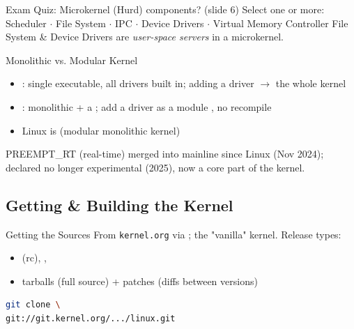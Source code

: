 \multend

\begin{example2}{Exam Quiz: Microkernel (Hurd) components? (slide 6)}
    Select one or more: Scheduler $\cdot$ File System $\cdot$ IPC $\cdot$
    Device Drivers $\cdot$ Virtual Memory Controller
    \tcblower
    File System \& Device Drivers are \emph{user-space servers} in a microkernel.
\end{example2}

\begin{definition}{Monolithic vs. Modular Kernel}
    \begin{itemize}
        \item {}: single executable, all drivers built in; adding
              a driver $\to$  the whole kernel
        \item {}: monolithic + a ; add a
              driver as a module , no recompile
        \item Linux is  (modular monolithic kernel)
    \end{itemize}
\end{definition}

\begin{remark}
     PREEMPT\_RT (real-time) merged into mainline since Linux
     (Nov 2024);  declared no longer experimental
    (2025), now a core part of the kernel.
\end{remark}

\subsection{Getting \& Building the Kernel}


\begin{definition}{Getting the Sources}
    From \texttt{kernel.org} via ; the "vanilla" kernel.
    Release types:
    \begin{itemize}
        \item {} (rc), , 
        \item tarballs (full source) + patches (diffs between versions)
    \end{itemize}
\begin{lstlisting}[language=bash, style=basesmol, aboveskip=2pt, belowskip=2pt]
git clone \
git://git.kernel.org/.../linux.git
\end{lstlisting}
\end{definition}

